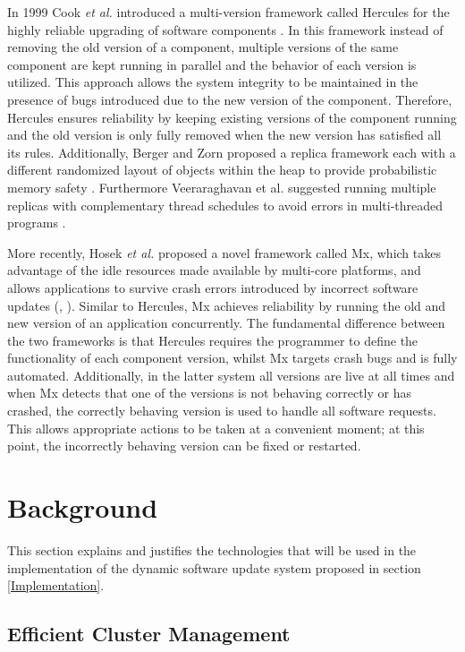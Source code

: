 \documentclass[a4paper,11pt,twoside]{article}
\begin{document}
In 1999 Cook \textit{et al.} introduced a multi-version framework called Hercules for the highly reliable upgrading of software components \cite{Cook}. In this framework instead of removing the old version of a component, multiple versions of the same component are kept running in parallel and the behavior of each version is utilized. This approach allows the system integrity to be maintained in the presence of bugs introduced due to the new version of the component. Therefore, Hercules ensures reliability by keeping existing versions of the component running and the old version is only fully removed when the new version has satisfied all its rules. Additionally, Berger and Zorn proposed a replica framework each with a different randomized layout of objects within the heap to provide probabilistic memory safety \cite{Berger}. Furthermore Veeraraghavan et al. suggested running multiple replicas with complementary thread schedules to avoid errors in multi-threaded programs \cite{Veeraraghavan}. 

More recently, Hosek \textit{et al.} proposed a novel framework called Mx, which takes advantage of the idle resources made available by multi-core platforms, and allows applications to survive crash errors introduced by incorrect software updates (\cite{Cadar1}, \cite{Cadar2}). Similar to Hercules, Mx achieves reliability by running the old and new version of an application concurrently. The fundamental difference between the two frameworks is that Hercules requires the programmer to define the functionality of each component version, whilst Mx targets crash bugs and is fully automated. Additionally, in the latter system all versions are live at all times and when Mx detects that one of the versions is not behaving correctly or has crashed, the correctly behaving version is used to handle all software requests. This allows appropriate actions to be taken at a convenient moment; at this point, the incorrectly behaving version can be fixed or restarted. 


\clearpage
\section{Background}
This section explains and justifies the technologies that will be used in the implementation of the dynamic software update system proposed in section \ref{Implementation}.
 
\subsection{Efficient Cluster Management} 
\end{document}
